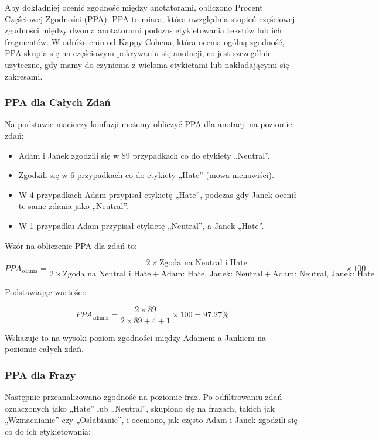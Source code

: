\documentclass[12pt]{article}
\begin{document}
Aby dokładniej ocenić zgodność między anotatorami, obliczono Procent Częściowej Zgodności (PPA). PPA to miara, która uwzględnia stopień częściowej zgodności między dwoma anotatorami podczas etykietowania tekstów lub ich fragmentów. W odróżnieniu od Kappy Cohena, która ocenia ogólną zgodność, PPA skupia się na częściowym pokrywaniu się anotacji, co jest szczególnie użyteczne, gdy mamy do czynienia z wieloma etykietami lub nakładającymi się zakresami.

\subsubsection{PPA dla Całych Zdań}

Na podstawie macierzy konfuzji możemy obliczyć PPA dla anotacji na poziomie zdań:

\begin{itemize}
    \item Adam i Janek zgodzili się w 89 przypadkach co do etykiety „Neutral”.
    \item Zgodzili się w 6 przypadkach co do etykiety „Hate” (mowa nienawiści).
    \item W 4 przypadkach Adam przypisał etykietę „Hate”, podczas gdy Janek ocenił te same zdania jako „Neutral”.
    \item W 1 przypadku Adam przypisał etykietę „Neutral”, a Janek „Hate”.
\end{itemize}

Wzór na obliczenie PPA dla zdań to:

\begin{dmath}
PPA_{\text{zdania}} = \frac{2 \times \text{Zgoda na Neutral i Hate}}{2 \times \text{Zgoda na Neutral i Hate} + \text{Adam: Hate, Janek: Neutral} + \text{Adam: Neutral, Janek: Hate}} \times 100
\end{dmath}

Podstawiając wartości:

\begin{dmath}
PPA_{\text{zdania}} = \frac{2 \times 89}{2 \times 89 + 4 + 1} \times 100 = 97.27\%
\end{dmath}

Wskazuje to na wysoki poziom zgodności między Adamem a Jankiem na poziomie całych zdań.

\subsubsection{PPA dla Frazy}

Następnie przeanalizowano zgodność na poziomie fraz. Po odfiltrowaniu zdań oznaczonych jako „Hate” lub „Neutral”, skupiono się na frazach, takich jak „Wzmacnianie” czy „Osłabianie”, i oceniono, jak często Adam i Janek zgodzili się co do ich etykietowania:
\end{document}
